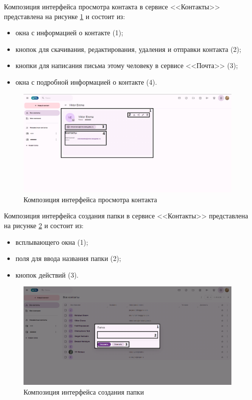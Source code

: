 Композиция интерфейса просмотра контакта в сервисе <<Контакты>> представлена на рисунке \ref{templ:image5b} и состоит из:
\begin{itemize}
  \item окна с информацией о контакте (1);
  \item кнопок для скачивания, редактирования, удаления и отправки контакта (2);
  \item кнопки для написания письма этому человеку в сервисе <<Почта>> (3);
  \item окна с подробной информацией о контакте (4).
\end{itemize}
\begin{figure}[H]
	\centering
	\includegraphics[width=1\linewidth]{images/контакты3}
	\caption{Композиция интерфейса просмотра контакта}
	\label{templ:image5b}
\end{figure}

Композиция интерфейса создания папки в сервисе <<Контакты>> представлена на рисунке \ref{templ:image5c} и состоит из:
\begin{itemize}
  \item всплывающего окна (1);
  \item поля для ввода названия папки (2);
  \item кнопок действий (3).
\end{itemize}
\begin{figure}[H]
	\centering
	\includegraphics[width=1\linewidth]{images/контакты4}
	\caption{Композиция интерфейса создания папки}
	\label{templ:image5c}
\end{figure}

